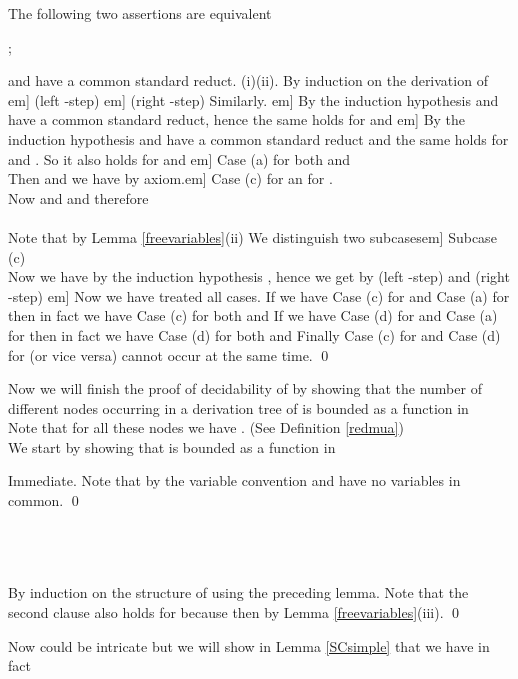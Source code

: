 \documentclass[11pt,aslarticle,xperspectives,bibay3]{asl}
\begin{document}
{\bprop\label{prmuaiscommstred}
The following two assertions are equivalent
\bsub\item ;
\item  and  have a common standard reduct.
\esub
\eprop
\bpf (i)(ii). By induction on the derivation of \1em]
(left -step)    \1em]
(right -step)      Similarly. \1em]
By the induction hypothesis  and  have a common standard reduct, hence the same holds for  and \1em]
By the induction hypothesis  and  have a common standard reduct and the same holds for  and . So it also holds for  and \1em]
Case (a) for both  and \\
 Then  and we have  by axiom.\1em]
Case (c) for  an for .\\
 Now  and  and therefore\\ \\
Note that  by Lemma \ref{freevariables}(ii)
We distinguish two subcases\1em]
Subcase (c)  \\
Now we have by the induction hypothesis , hence we get by (left -step) and (right -step) 
\1em]
Now we have treated all cases. If we have Case (c) for  and Case (a) for  then in fact we have Case (c) for both  and  If we have Case (d) for  and Case (a) for  then in fact we have Case (d) for both  and 
Finally Case (c) for  and Case (d) for   (or vice versa) cannot occur at the same time. \qed
\epf

Now we will finish the proof of decidability of  by showing that the number of different nodes  occurring in a derivation tree of  is bounded as a function in \\
Note that for all these nodes  we have . (See Definition \ref{redmua})\\
We start by showing that  is bounded as a function in 

\blem\label{mualpharestricted}  
\elem
\bpf  Immediate. Note that by the variable convention  and  have no variables in common. \qed
\epf

\blem\label{SC} 
\\
\\
\\

\elem
\bpf By induction on the structure of  using the preceding lemma. Note that the second clause also holds for  because then  by Lemma \ref{freevariables}(iii). \qed
\epf

Now  could be intricate but we will show in Lemma \ref{SCsimple} that we have in fact 

}
\end{document}
